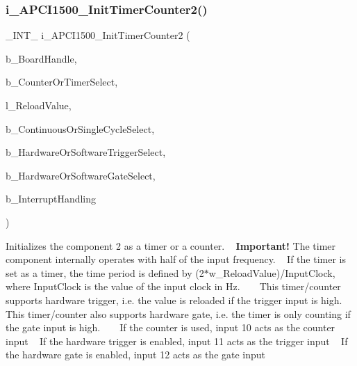 \subsubsection{\texorpdfstring{i\_APCI1500\_InitTimerCounter2()}{i\_APCI1500\_InitTimerCounter2()}}
{\footnotesize\ttfamily \+\_\+\+I\+N\+T\+\_\+ i\+\_\+\+A\+P\+C\+I1500\+\_\+\+Init\+Timer\+Counter2 (\begin{DoxyParamCaption}\item[{B\+Y\+T\+E\+\_\+}]{b\+\_\+\+Board\+Handle,  }\item[{B\+Y\+T\+E\+\_\+}]{b\+\_\+\+Counter\+Or\+Timer\+Select,  }\item[{L\+O\+N\+G\+\_\+}]{l\+\_\+\+Reload\+Value,  }\item[{B\+Y\+T\+E\+\_\+}]{b\+\_\+\+Continuous\+Or\+Single\+Cycle\+Select,  }\item[{B\+Y\+T\+E\+\_\+}]{b\+\_\+\+Hardware\+Or\+Software\+Trigger\+Select,  }\item[{B\+Y\+T\+E\+\_\+}]{b\+\_\+\+Hardware\+Or\+Software\+Gate\+Select,  }\item[{B\+Y\+TE}]{b\+\_\+\+Interrupt\+Handling }\end{DoxyParamCaption})}

Initializes the component 2 as a timer or a counter. ~\newline
 {\bfseries{Important!}} The timer component internally operates with half of the input frequency. ~\newline
 If the timer is set as a timer, the time period is defined by (2$\ast$w\+\_\+\+Reload\+Value)/\+Input\+Clock, where Input\+Clock is the value of the input clock in Hz. ~\newline
 ~\newline
 This timer/counter supports hardware trigger, i.\+e. the value is reloaded if the trigger input is high. ~\newline
 This timer/counter also supports hardware gate, i.\+e. the timer is only counting if the gate input is high. ~\newline
 ~\newline
 If the counter is used, input 10 acts as the counter input ~\newline
 If the hardware trigger is enabled, input 11 acts as the trigger input ~\newline
 If the hardware gate is enabled, input 12 acts as the gate input ~\newline
 
